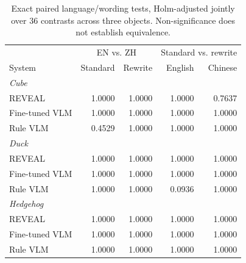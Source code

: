 \begin{table}[t]
\centering\footnotesize
\setlength{\tabcolsep}{2pt}
\begin{tabular}{@{}lrrrr@{}}
\toprule
 & \multicolumn{2}{c}{EN vs. ZH} & \multicolumn{2}{c}{Standard vs. rewrite}\\
System & Standard & Rewrite & English & Chinese\\
\midrule
\multicolumn{5}{l}{\textit{Cube}}\\
REVEAL & 1.0000 & 1.0000 & 1.0000 & 0.7637\\
Fine-tuned VLM & 1.0000 & 1.0000 & 1.0000 & 1.0000\\
Rule VLM & 0.4529 & 1.0000 & 1.0000 & 1.0000\\
\midrule
\multicolumn{5}{l}{\textit{Duck}}\\
REVEAL & 1.0000 & 1.0000 & 1.0000 & 1.0000\\
Fine-tuned VLM & 1.0000 & 1.0000 & 1.0000 & 1.0000\\
Rule VLM & 1.0000 & 1.0000 & 0.0936 & 1.0000\\
\midrule
\multicolumn{5}{l}{\textit{Hedgehog}}\\
REVEAL & 1.0000 & 1.0000 & 1.0000 & 1.0000\\
Fine-tuned VLM & 1.0000 & 1.0000 & 1.0000 & 1.0000\\
Rule VLM & 1.0000 & 1.0000 & 1.0000 & 1.0000\\
\bottomrule
\end{tabular}
\caption{Exact paired language/wording tests, Holm-adjusted jointly over 36 contrasts across three objects. Non-significance does not establish equivalence.}
\label{tab:language-wording-tests}
\end{table}
